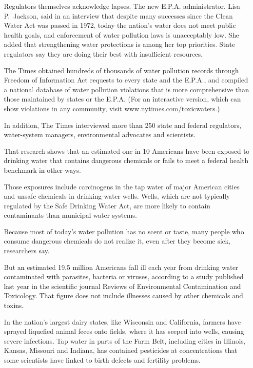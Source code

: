 ﻿\documentclass[12pt]{article}
\begin{document}
Regulators themselves acknowledge lapses\cite{lapse}. The new E.P.A. administrator, Lisa P.~Jackson,
said in an interview that despite many successes since the Clean Water Act was passed in 1972, today
the nation's water does not meet public health goals, and enforcement of water pollution laws is
unacceptably low. She added that strengthening water protections is among her top priorities. State
regulators say they are doing their best with insufficient resources.

The Times obtained hundreds of thousands of water pollution records through Freedom of Information
Act requests to every state and the E.P.A., and compiled a national database of water pollution
violations that is more comprehensive than those maintained by states or the E.P.A. (For an
interactive version, which can show violations in any community, visit www.nytimes.com/toxicwaters.)

In addition, The Times interviewed more than 250 state and federal regulators, water-system
managers, environmental advocates and scientists.

That research shows that an estimated one in 10 Americans have been exposed to drinking water that
contains dangerous chemicals or fails to meet a federal health benchmark in other ways.

Those exposures include carcinogens\cite{carcinogen} in the tap water of major American cities and
unsafe chemicals in drinking-water wells. Wells, which are not typically regulated by the Safe
Drinking Water Act, are more likely to contain contaminants than municipal water systems.

Because most of today's water pollution has no scent or taste, many people who consume dangerous
chemicals do not realize it, even after they become sick, researchers say.

But an estimated 19.5 million Americans fall ill each year from drinking water contaminated with
parasites\cite{parasite}, bacteria or viruses, according to a study published last year in the
scientific journal Reviews of Environmental Contamination and Toxicology. That figure does not
include illnesses caused by other chemicals and toxins.

In the nation's largest dairy states, like Wisconsin and California, farmers have sprayed liquefied
animal feces onto fields, where it has seeped into wells, causing severe infections. Tap water in
parts of the Farm Belt, including cities in Illinois, Kansas, Missouri and Indiana, has contained
pesticides at concentrations that some scientists have linked to birth defects and fertility
problems.
\end{document}
